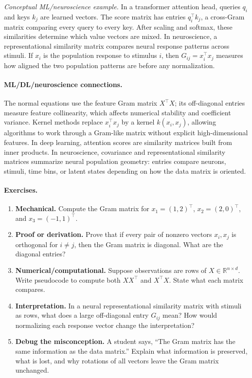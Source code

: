 \emph{Conceptual ML/neuroscience example.} In a transformer attention head, queries \(q_i\) and keys \(k_j\) are learned vectors. The score matrix has entries \(q_i^\top k_j\), a cross-Gram matrix comparing every query to every key. After scaling and softmax, these similarities determine which value vectors are mixed. In neuroscience, a representational similarity matrix compares neural response patterns across stimuli. If \(x_i\) is the population response to stimulus \(i\), then \(G_{ij}=x_i^\top x_j\) measures how aligned the two population patterns are before any normalization.

\paragraph{ML/DL/neuroscience connections.}
The normal equations use the feature Gram matrix \(X^\top X\); its off-diagonal entries measure feature collinearity, which affects numerical stability and coefficient variance. Kernel methods replace \(x_i^\top x_j\) by a kernel \(k(x_i,x_j)\), allowing algorithms to work through a Gram-like matrix without explicit high-dimensional features. In deep learning, attention scores are similarity matrices built from inner products. In neuroscience, covariance and representational similarity matrices summarize neural population geometry: entries compare neurons, stimuli, time bins, or latent states depending on how the data matrix is oriented.

\paragraph{Exercises.}
\begin{enumerate}[label=\textbf{5.3.\arabic*.}, leftmargin=*]
\item \textbf{Mechanical.} Compute the Gram matrix for \(x_1=(1,2)^\top\), \(x_2=(2,0)^\top\), and \(x_3=(-1,1)^\top\).
\item \textbf{Proof or derivation.} Prove that if every pair of nonzero vectors \(x_i,x_j\) is orthogonal for \(i\neq j\), then the Gram matrix is diagonal. What are the diagonal entries?
\item \textbf{Numerical/computational.} Suppose observations are rows of \(X\in\mathbb{R}^{n\times d}\). Write pseudocode to compute both \(XX^\top\) and \(X^\top X\). State what each matrix compares.
\item \textbf{Interpretation.} In a neural representational similarity matrix with stimuli as rows, what does a large off-diagonal entry \(G_{ij}\) mean? How would normalizing each response vector change the interpretation?
\item \textbf{Debug the misconception.} A student says, ``The Gram matrix has the same information as the data matrix.'' Explain what information is preserved, what is lost, and why rotations of all vectors leave the Gram matrix unchanged.
\end{enumerate}

